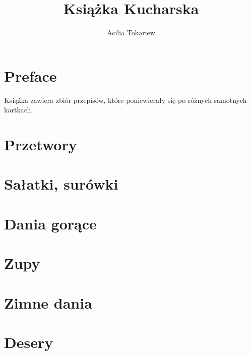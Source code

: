 \documentclass[14pt,twoside,parskip=half*]{scrbook}
\title{Książka Kucharska}
\author{Acilia Tokariew}
\begin{document}
\frontmatter{}
\maketitle{}
\tableofcontents{}
\chapter{Preface}
Książka zawiera zbiór przepisów, które poniewierały się po różnych samotnych
kartkach.

\mainmatter{}

\chapter{Przetwory}

\label{ch:przetwory}

\chapter{Sałatki, surówki}

\label{ch:salatki-surowki}

\chapter{Dania gorące}

\label{ch:dania-gorace}

\chapter{Zupy}

\label{ch:zupy}

\chapter{Zimne dania}

\label{ch:zimne-dania}

\chapter{Desery}

\label{ch:desery}
\end{document}
